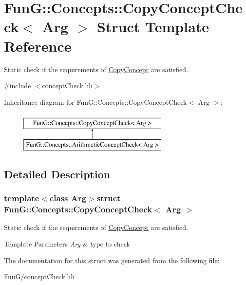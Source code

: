 \hypertarget{structFunG_1_1Concepts_1_1CopyConceptCheck}{\section{Fun\-G\-:\-:Concepts\-:\-:Copy\-Concept\-Check$<$ Arg $>$ Struct Template Reference}
\label{structFunG_1_1Concepts_1_1CopyConceptCheck}
}


Static check if the requirements of \hyperlink{structFunG_1_1Concepts_1_1CopyConcept}{Copy\-Concept} are satisfied.  




{\ttfamily \#include $<$concept\-Check.\-hh$>$}

Inheritance diagram for Fun\-G\-:\-:Concepts\-:\-:Copy\-Concept\-Check$<$ Arg $>$\-:\begin{figure}[H]
\begin{center}
\leavevmode
\includegraphics[height=2.000000cm]{structFunG_1_1Concepts_1_1CopyConceptCheck}
\end{center}
\end{figure}


\subsection{Detailed Description}
\subsubsection*{template$<$class Arg$>$struct Fun\-G\-::\-Concepts\-::\-Copy\-Concept\-Check$<$ Arg $>$}

Static check if the requirements of \hyperlink{structFunG_1_1Concepts_1_1CopyConcept}{Copy\-Concept} are satisfied. 


\begin{DoxyTemplParams}{Template Parameters}
{\em Arg} & type to check \\
\hline
\end{DoxyTemplParams}


The documentation for this struct was generated from the following file\-:\begin{DoxyCompactItemize}
\item 
Fun\-G/concept\-Check.\-hh\end{DoxyCompactItemize}
